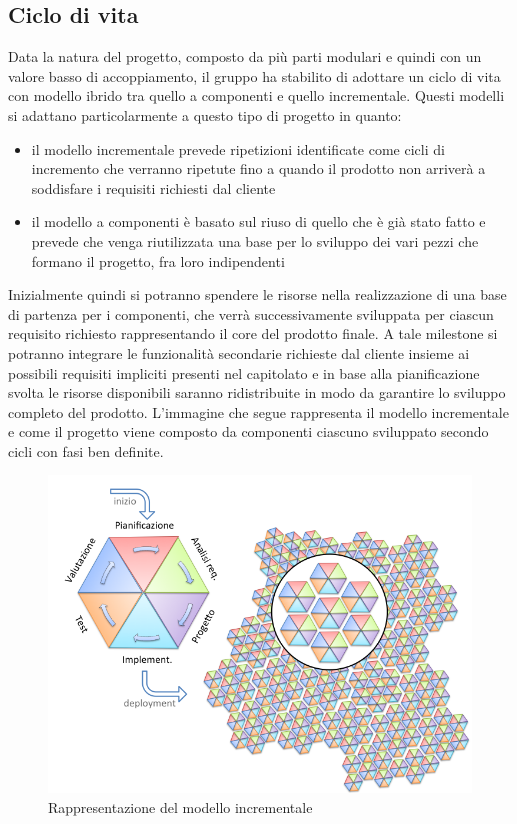 	\subsection{Ciclo di vita}
	Data la natura del progetto, composto da più parti modulari e quindi con un valore basso di accoppiamento, il gruppo ha stabilito di adottare un ciclo di vita con modello ibrido tra quello a componenti e quello incrementale.
	Questi modelli si adattano particolarmente a questo tipo di progetto in quanto:
	\begin{itemize}
		\item il modello incrementale prevede ripetizioni identificate come cicli di incremento che verranno ripetute fino a quando il prodotto non arriverà a soddisfare i requisiti richiesti dal cliente
		\item il modello a componenti è basato sul riuso di quello che è già stato fatto e prevede che venga riutilizzata una base per lo sviluppo dei vari pezzi che formano il progetto, fra loro indipendenti
	\end{itemize}
	Inizialmente quindi si potranno spendere le risorse nella realizzazione di una base di partenza per i componenti, che verrà successivamente sviluppata per ciascun requisito richiesto rappresentando il core del prodotto finale.
	A tale milestone si potranno integrare le funzionalità secondarie richieste dal cliente insieme ai possibili requisiti impliciti presenti nel capitolato e in base alla pianificazione svolta le risorse disponibili saranno ridistribuite in modo da garantire lo sviluppo completo del prodotto.
	L'immagine che segue rappresenta il modello incrementale e come il progetto viene composto da componenti ciascuno sviluppato secondo cicli con fasi ben definite.
	\begin{figure}[H]
		\centering
		\includegraphics[scale=0.5]{img/modello_incrementale.png}
		\caption{Rappresentazione del modello incrementale \protect\footnotemark}
	\end{figure}

	